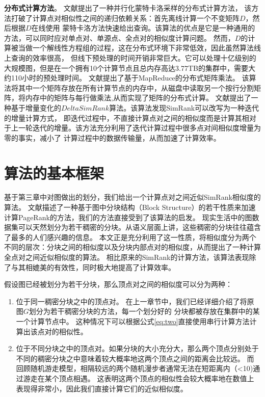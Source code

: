 \documentclass[master]{njuthesis}
\begin{document}
\textbf{分布式计算方法}。 文献\cite{DBLP:journals/pvldb/LiFLCCL15}提出了一种并行化蒙特卡洛采样的分布式计算方法，
该方法打破了计算点对相似性之间的递归依赖关系：首先离线计算一个不变矩阵$D$，然后根据$D$在线使用
蒙特卡洛方法快速给出查询。该算法的优点是它是一种通用的方法，可以同时应对单点对、单源点、全点对的相似度计算问题。
然而，$D$的计算被当做一个解线性方程组的过程，这在分布式环境下非常低效，因此虽然算法线上查询的效率很高，
但线下预处理的时间开销非常巨大。它可以处理十亿级别的大规模图，但是在一个拥有10个计算节点且总内存高达3.77TB的集群中，需要大约110小时的预处理时间。
文献\cite{DBLP:conf/bigdata/LiLCD13}提出了基于MapReduce的分布式矩阵乘法。
该算法将其中一个矩阵存放在所有计算节点的内存中，从磁盘中读取另一个按行分割矩阵，将内存中的矩阵与每行做乘法,从而实现了矩阵的分布式计算。
文献\cite{yu2013towards}提出了一种基于增量变化的$DeltaSimRank$算法。该算法发现SimRank可以改写为一种迭代的增量计算方式，
即迭代过程中，不直接计算点对之间的相似度而是计算其相对于上一轮迭代的增量。该方法充分利用了迭代计算过程中很多点对间相似度增量为零的事实，减小了
计算过程中的数据传输量，从而加速了计算效率。

\section{算法的基本框架}
基于第三章中对图做出的划分，我们给出一个计算点对之间近似SimRank相似度的算法。
文献\cite{ilprints579}描述了一种基于图中分块结构（Block Structure）的若干性质来加速计算PageRank的方法，我们的方法直接受到了该算法的启发。
现实生活中的图数据集可以天然划分为若干稠密的分块。从语义层面上讲，这些稠密的分块往往蕴含了最多的人们感兴趣的信息。
本文正是充分利用了这一性质，将相似度分为两个不同的层次：分块之间的相似度以及分块内部点对的相似度，从而提出了一种计算全点对之间近似相似度的算法。
相比原来的SimRank的计算方法，该算法表现除了与其相媲美的有效性，同时极大地提高了计算效率。

假设图已经被划分为若干分块，那么顶点对之间的相似度可以分为两种：
\begin{enumerate}
 \item 位于同一稠密分块之中的顶点对。 在上一章节中，我们已经详细介绍了将原图$G$划分为若干稠密分块的方法，每一个划分好的
 分块都被存放在集群中的某一个计算节点中。 这种情况下可以根据公式\ref{eq:two}直接使用串行计算方法计算出该点对的相似性。
 \item 位于不同分块之中的顶点对。如果分块的大小充分大，那么两个顶点分别处于不同的稠密分块之中意味着较大概率地这两个顶点之间的距离会比较远。
 而回顾随机游走模型，相隔较远的两个随机漫步者通常无法在短距离内（<10)通过游走在某个顶点相遇。
 这表明这两个顶点的相似性会较大概率地在数值上表现得非常小，因此我们直接计算它们的近似相似度。
\end{enumerate}
\end{document}
